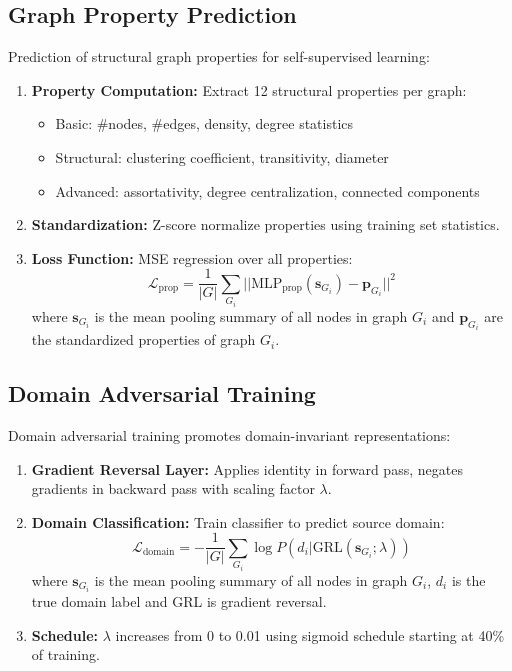 \documentclass[11pt]{article}
\begin{document}
\subsection{Graph Property Prediction}
\label{sec:graph-prop}

Prediction of structural graph properties for self-supervised learning:

\begin{enumerate}
\item \textbf{Property Computation:} Extract 12 structural properties per graph:
\begin{itemize}
\item Basic: \#nodes, \#edges, density, degree statistics
\item Structural: clustering coefficient, transitivity, diameter
\item Advanced: assortativity, degree centralization, connected components
\end{itemize}

\item \textbf{Standardization:} Z-score normalize properties using training set statistics.

\item \textbf{Loss Function:} MSE regression over all properties:
\begin{equation*}
\mathcal{L}_{\text{prop}} = \frac{1}{|G|} \sum_{G_i} ||\text{MLP}_{\text{prop}}(\mathbf{s}_{G_i}) - \mathbf{p}_{G_i}||^2
\end{equation*}
where $\mathbf{s}_{G_i}$ is the mean pooling summary of all nodes in graph $G_i$ and $\mathbf{p}_{G_i}$ are the standardized properties of graph $G_i$.
\end{enumerate}

\subsection{Domain Adversarial Training}
\label{sec:domain-adv}

Domain adversarial training promotes domain-invariant representations:

\begin{enumerate}
\item \textbf{Gradient Reversal Layer:} Applies identity in forward pass, negates gradients in backward pass with scaling factor $\lambda$.

\item \textbf{Domain Classification:} Train classifier to predict source domain:
\begin{equation*}
\mathcal{L}_{\text{domain}} = -\frac{1}{|G|} \sum_{G_i} \log P(d_i | \text{GRL}(\mathbf{s}_{G_i}; \lambda))
\end{equation*}
where $\mathbf{s}_{G_i}$ is the mean pooling summary of all nodes in graph $G_i$, $d_i$ is the true domain label and GRL is gradient reversal.

\item \textbf{Schedule:} $\lambda$ increases from 0 to 0.01 using sigmoid schedule starting at 40\% of training.
\end{enumerate}
\end{document}

